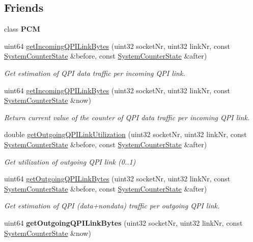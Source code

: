 \subsection*{Friends}
\begin{DoxyCompactItemize}
\item 
\mbox{\label{class_system_counter_state_ab5f56d2e95ba3daf52c17b8a1d356d64}} 
class {\bfseries P\+CM}
\item 
uint64 \mbox{\hyperlink{class_system_counter_state_aca1b1d8ba1679c4a0c394c2647428fd3}{get\+Incoming\+Q\+P\+I\+Link\+Bytes}} (uint32 socket\+Nr, uint32 link\+Nr, const \mbox{\hyperlink{class_system_counter_state}{System\+Counter\+State}} \&before, const \mbox{\hyperlink{class_system_counter_state}{System\+Counter\+State}} \&after)
\begin{DoxyCompactList}\small\item\em Get estimation of Q\+PI data traffic per incoming Q\+PI link. \end{DoxyCompactList}\item 
uint64 \mbox{\hyperlink{class_system_counter_state_a42d6a119a26ea41c40d5585356d832ca}{get\+Incoming\+Q\+P\+I\+Link\+Bytes}} (uint32 socket\+Nr, uint32 link\+Nr, const \mbox{\hyperlink{class_system_counter_state}{System\+Counter\+State}} \&now)
\begin{DoxyCompactList}\small\item\em Return current value of the counter of Q\+PI data traffic per incoming Q\+PI link. \end{DoxyCompactList}\item 
double \mbox{\hyperlink{class_system_counter_state_ac7b1863133a9a711117fcb8b68d2d773}{get\+Outgoing\+Q\+P\+I\+Link\+Utilization}} (uint32 socket\+Nr, uint32 link\+Nr, const \mbox{\hyperlink{class_system_counter_state}{System\+Counter\+State}} \&before, const \mbox{\hyperlink{class_system_counter_state}{System\+Counter\+State}} \&after)
\begin{DoxyCompactList}\small\item\em Get utilization of outgoing Q\+PI link (0..1) \end{DoxyCompactList}\item 
uint64 \mbox{\hyperlink{class_system_counter_state_a6bdb34d102d7353421bd878da7b9ef23}{get\+Outgoing\+Q\+P\+I\+Link\+Bytes}} (uint32 socket\+Nr, uint32 link\+Nr, const \mbox{\hyperlink{class_system_counter_state}{System\+Counter\+State}} \&before, const \mbox{\hyperlink{class_system_counter_state}{System\+Counter\+State}} \&after)
\begin{DoxyCompactList}\small\item\em Get estimation of Q\+PI (data+nondata) traffic per outgoing Q\+PI link. \end{DoxyCompactList}\item 
\mbox{\label{class_system_counter_state_a336f198b4a81e0d34bb581e8bd8be0e0}} 
uint64 {\bfseries get\+Outgoing\+Q\+P\+I\+Link\+Bytes} (uint32 socket\+Nr, uint32 link\+Nr, const \mbox{\hyperlink{class_system_counter_state}{System\+Counter\+State}} \&now)
\end{DoxyCompactItemize}
